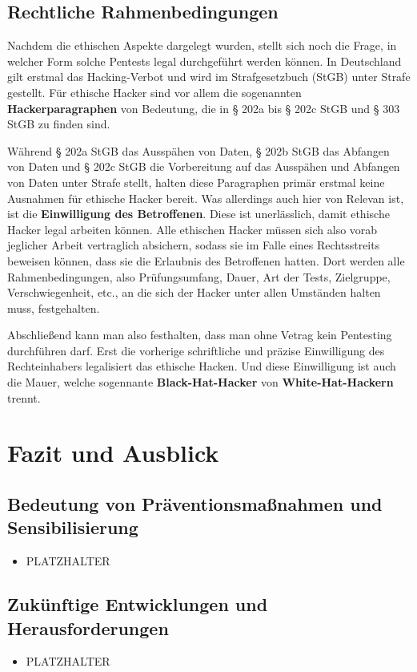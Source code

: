 \documentclass[12pt, a4paper, oneside]{scrartcl}
\begin{document}
\subsection{Rechtliche Rahmenbedingungen}
Nachdem die ethischen Aspekte dargelegt wurden, stellt sich noch die Frage, in welcher Form solche 
Pentests legal durchgeführt werden können. In Deutschland gilt erstmal das Hacking-Verbot und wird 
im Strafgesetzbuch (StGB) unter Strafe gestellt. Für ethische Hacker sind vor allem die  
sogenannten \textbf{Hackerparagraphen} von Bedeutung, die in § 202a bis § 202c StGB und § 303 StGB zu finden sind.
\par
Während § 202a StGB das Ausspähen von Daten, § 202b StGB das Abfangen von Daten und § 202c StGB 
die Vorbereitung auf das Ausspähen und Abfangen von Daten unter Strafe stellt, halten diese Paragraphen
primär erstmal keine Ausnahmen für ethische Hacker bereit. Was allerdings auch hier von Relevan ist, 
ist die \textbf{Einwilligung des Betroffenen}. Diese ist unerlässlich, damit ethische Hacker legal arbeiten können.
Alle ethischen Hacker müssen sich also vorab jeglicher Arbeit vertraglich absichern, sodass sie im 
Falle eines Rechtsstreits beweisen können, dass sie die Erlaubnis des Betroffenen hatten. Dort werden alle
Rahmenbedingungen, also Prüfungsumfang, Dauer, Art der Tests, Zielgruppe, Verschwiegenheit, etc., an die sich der Hacker 
unter allen Umständen halten muss, festgehalten.
\par
Abschließend kann man also festhalten, dass man ohne Vetrag kein Pentesting durchführen darf. Erst die vorherige
schriftliche und präzise Einwilligung des Rechteinhabers legalisiert das ethische Hacken. Und diese Einwilligung
ist auch die Mauer, welche sogennante \textbf{Black-Hat-Hacker} von \textbf{White-Hat-Hackern} trennt.\\


\section{Fazit und Ausblick}

\subsection{Bedeutung von Präventionsmaßnahmen und Sensibilisierung}
\begin{itemize}
  \item PLATZHALTER
\end{itemize}

\subsection{Zukünftige Entwicklungen und Herausforderungen}
\begin{itemize}
  \item PLATZHALTER
\end{itemize}

\clearpage
\printbibliography[title={Literaturverzeichnis}]
\end{document}
